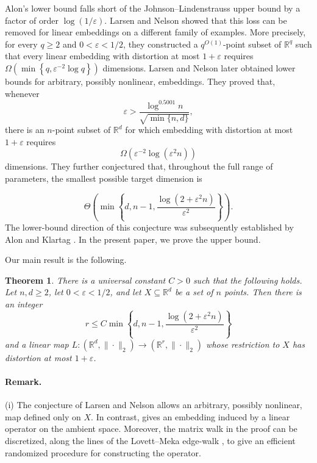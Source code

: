 \documentclass[11pt,reqno,letterpaper]{amsart}
\newtheorem{theorem}{Theorem}[section]
\newcommand{\R}{\mathbb R}
\begin{document}
Alon's lower bound
falls short of the Johnson--Lindenstrauss upper bound by a factor of
order $\log(1/\varepsilon)$. Larsen and Nelson \cite{LNlinear} showed that this loss can
be removed for linear embeddings on a different family of examples. More precisely, for every $q\geq2$ and
$0<\varepsilon<1/2$, they constructed a $q^{O(1)}$-point subset of
$\R^q$ such that every linear embedding with distortion at most
$1+\varepsilon$ requires
$
 \Omega\left(
 \min\left\{
 q,\varepsilon^{-2}\log q
 \right\}
 \right)
$
dimensions. Larsen and Nelson \cite{LNnonlinear} later obtained lower bounds for arbitrary,
possibly nonlinear, embeddings. They proved that,
whenever
\[
 \varepsilon>
 \frac{\log^{0.5001}n}{\sqrt{\min\{n,d\}}},
\]
there is an $n$-point subset of $\R^d$ for which embedding with distortion at most $1+\varepsilon$
requires
\[
 \Omega\left(
 \varepsilon^{-2}\log(\varepsilon^2n)
 \right)
\]
dimensions. They further conjectured \cite[Conjecture~1]{LNnonlinear} that, throughout the full range of
parameters, the smallest possible target dimension is

\[
 \Theta\left(
 \min\left\{
 d,n-1,\frac{\log(2+\varepsilon^2n)}{\varepsilon^2}
 \right\}
 \right).
\]
The lower-bound direction of this conjecture was subsequently established
by Alon and Klartag \cite{AK}. In the present paper, we prove the
upper bound.

\medskip

Our main result is the following.

\begin{theorem}
\label{thm:jl-main}
There is a universal constant $C>0$ such that the following holds. Let
$n,d\geq2$, let $0<\varepsilon<1/2$, and let $X\subseteq\R^d$ be a set
of $n$ points. Then there is an integer
\[
 r\leq
 C\min\left\{
 d,n-1,\frac{\log(2+\varepsilon^2n)}{\varepsilon^2}
 \right\}
\]
and a linear map $L:(\R^d, \|\cdot \|_2)\to (\R^r, \|\cdot \|_2)$ whose restriction to $X$ has distortion
at most $1+\varepsilon$. 
\end{theorem}

\paragraph{\bf Remark.}
{(i)} The conjecture of Larsen and Nelson allows an arbitrary, possibly
nonlinear, map defined only on $X$. In contrast,
 gives an embedding induced by a linear operator on
the ambient space. Moreover, the matrix walk in the proof can be discretized, along the lines of the Lovett--Meka edge-walk \cite{LM}, to give an efficient randomized procedure for constructing the
operator.
\end{document}
